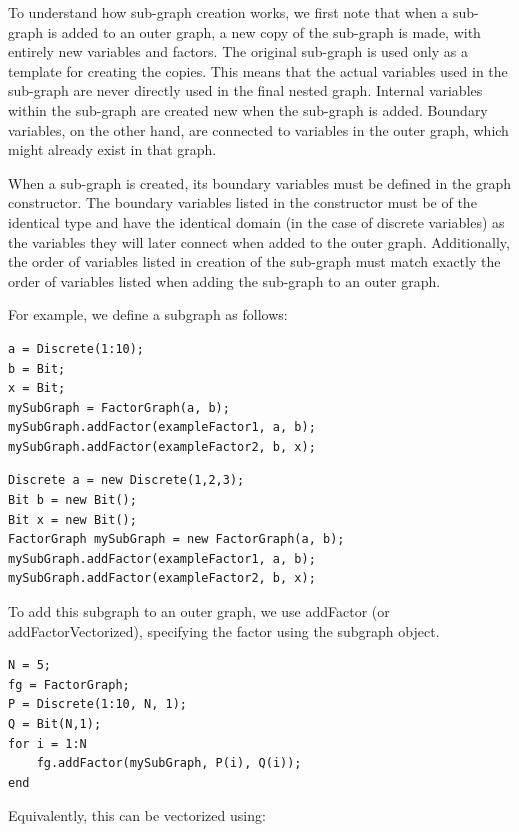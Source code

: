 To understand how sub-graph creation works, we first note that when a sub-graph is added to an outer graph, a new copy of the sub-graph is made, with entirely new variables and factors.  The original sub-graph is used only as a template for creating the copies.  This means that the actual variables used in the sub-graph are never directly used in the final nested graph.  Internal variables within the sub-graph are created new when the sub-graph is added. Boundary variables, on the other hand, are connected to variables in the outer graph, which might already exist in that graph.

When a sub-graph is created, its boundary variables must be defined in the graph constructor.  The boundary variables listed in the constructor must be of the identical type and have the identical domain (in the case of discrete variables) as the variables they will later connect when added to the outer graph.  Additionally, the order of variables listed in creation of the sub-graph must match exactly the order of variables listed when adding the sub-graph to an outer graph.

For example, we define a subgraph as follows:

\ifmatlab

\begin{lstlisting}
a = Discrete(1:10);
b = Bit;
x = Bit;
mySubGraph = FactorGraph(a, b);
mySubGraph.addFactor(exampleFactor1, a, b);
mySubGraph.addFactor(exampleFactor2, b, x);
\end{lstlisting}

\fi

\ifjava
\begin{lstlisting}
Discrete a = new Discrete(1,2,3);
Bit b = new Bit();
Bit x = new Bit();
FactorGraph mySubGraph = new FactorGraph(a, b);
mySubGraph.addFactor(exampleFactor1, a, b);
mySubGraph.addFactor(exampleFactor2, b, x);
\end{lstlisting}
\fi

To add this subgraph to an outer graph, we use addFactor \ifmatlab (or addFactorVectorized)\fi, specifying the factor using the subgraph object.

\ifmatlab

\begin{lstlisting}
N = 5;
fg = FactorGraph;
P = Discrete(1:10, N, 1);
Q = Bit(N,1);
for i = 1:N
    fg.addFactor(mySubGraph, P(i), Q(i));
end
\end{lstlisting}

Equivalently, this can be vectorized using:

